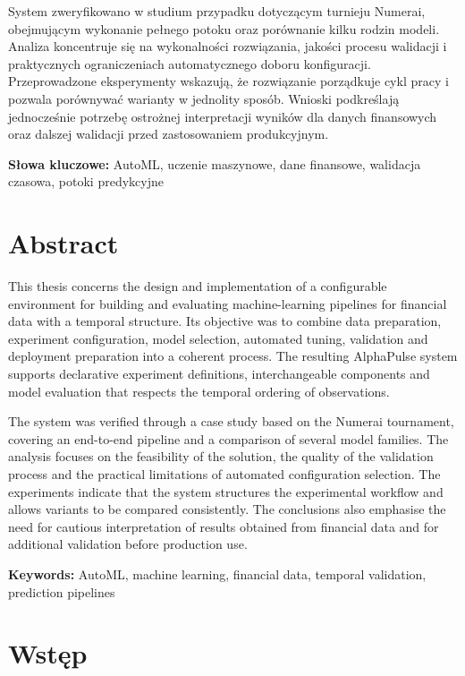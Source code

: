 \documentclass[12pt,a4paper]{report}
\begin{document}
System zweryfikowano w studium przypadku dotyczącym turnieju Numerai, obejmującym
wykonanie pełnego potoku oraz porównanie kilku rodzin modeli. Analiza koncentruje
się na wykonalności rozwiązania, jakości procesu walidacji i praktycznych
ograniczeniach automatycznego doboru konfiguracji. Przeprowadzone eksperymenty
wskazują, że rozwiązanie porządkuje cykl pracy i pozwala porównywać warianty
w jednolity sposób. Wnioski podkreślają jednocześnie potrzebę ostrożnej
interpretacji wyników dla danych finansowych oraz dalszej walidacji przed
zastosowaniem produkcyjnym.

\par\medskip
\noindent\textbf{Słowa kluczowe:} AutoML, uczenie maszynowe, dane finansowe,
walidacja czasowa, potoki predykcyjne

\chapter*{Abstract}
This thesis concerns the design and implementation of a configurable environment
for building and evaluating machine-learning pipelines for financial data with a
temporal structure. Its objective was to combine data preparation, experiment
configuration, model selection, automated tuning, validation and deployment
preparation into a coherent process. The resulting AlphaPulse system supports
declarative experiment definitions, interchangeable components and model
evaluation that respects the temporal ordering of observations.

The system was verified through a case study based on the Numerai tournament,
covering an end-to-end pipeline and a comparison of several model families. The
analysis focuses on the feasibility of the solution, the quality of the validation
process and the practical limitations of automated configuration selection. The
experiments indicate that the system structures the experimental workflow and
allows variants to be compared consistently. The conclusions also emphasise the
need for cautious interpretation of results obtained from financial data and for
additional validation before production use.

\par\medskip
\noindent\textbf{Keywords:} AutoML, machine learning, financial data, temporal
validation, prediction pipelines

\setcounter{tocdepth}{0}
\begingroup
\singlespacing
\tableofcontents
\endgroup

\chapter{Wstęp}
\end{document}
